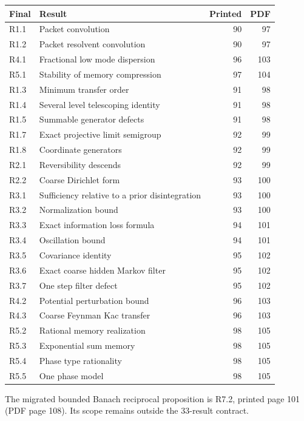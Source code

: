 \begin{longtable}{@{}p{.12\linewidth}p{.61\linewidth}rr@{}}\toprule Final & Result & Printed & PDF\\\midrule\endhead
R1.1 & Packet convolution & 90 & 97\\
R1.2 & Packet resolvent convolution & 90 & 97\\
R4.1 & Fractional low mode dispersion & 96 & 103\\
R5.1 & Stability of memory compression & 97 & 104\\
R1.3 & Minimum transfer order & 91 & 98\\
R1.4 & Several level telescoping identity & 91 & 98\\
R1.5 & Summable generator defects & 91 & 98\\
R1.7 & Exact projective limit semigroup & 92 & 99\\
R1.8 & Coordinate generators & 92 & 99\\
R2.1 & Reversibility descends & 92 & 99\\
R2.2 & Coarse Dirichlet form & 93 & 100\\
R3.1 & Sufficiency relative to a prior disintegration & 93 & 100\\
R3.2 & Normalization bound & 93 & 100\\
R3.3 & Exact information loss formula & 94 & 101\\
R3.4 & Oscillation bound & 94 & 101\\
R3.5 & Covariance identity & 95 & 102\\
R3.6 & Exact coarse hidden Markov filter & 95 & 102\\
R3.7 & One step filter defect & 95 & 102\\
R4.2 & Potential perturbation bound & 96 & 103\\
R4.3 & Coarse Feynman Kac transfer & 96 & 103\\
R5.2 & Rational memory realization & 98 & 105\\
R5.3 & Exponential sum memory & 98 & 105\\
R5.4 & Phase type rationality & 98 & 105\\
R5.5 & One phase model & 98 & 105\\
\bottomrule\end{longtable}
The migrated bounded Banach reciprocal proposition is R7.2, printed page 101 (PDF page 108). Its scope remains outside the 33-result contract.
